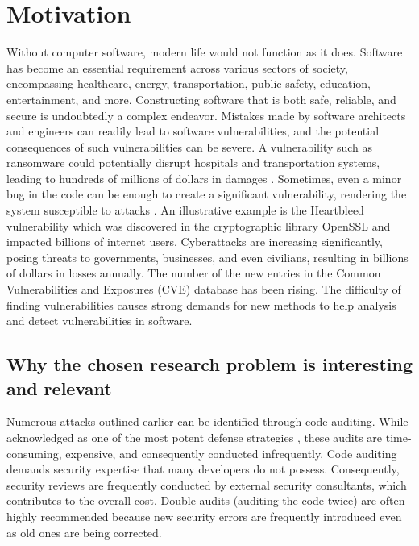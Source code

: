 \section{Motivation} %
\label{sec:motivation_chapter}
Without computer software, modern life would not function as it does. Software has become an essential requirement across various sectors of society, encompassing healthcare, energy, transportation, public safety, education, entertainment, and more. Constructing software that is both safe, reliable, and secure is undoubtedly a complex endeavor. Mistakes made by software architects and engineers can readily lead to software vulnerabilities, and the potential consequences of such vulnerabilities can be severe. A vulnerability such as ransomware could potentially disrupt hospitals and transportation systems, leading to hundreds of millions of dollars in damages \cite{Nadeem_Mohammed2023}. Sometimes, even a minor bug in the code can be enough to create a significant vulnerability, rendering the system susceptible to attacks \cite{Fabian_Markus_Konrad2023}. An illustrative example is the Heartbleed vulnerability \cite{Zakir_Durumeric2023} which was discovered in the cryptographic library OpenSSL and impacted billions of internet users. Cyberattacks are increasing significantly, posing threats to governments, businesses, and even civilians, resulting in billions of dollars in losses annually. The number of the new entries in the Common Vulnerabilities and Exposures (CVE) database has been rising. The difficulty of finding vulnerabilities causes strong demands for new methods to help analysis and detect vulnerabilities in software.

\subsection{ Why the chosen research problem is interesting and relevant} %
\label{sub:Research_relevance}

Numerous attacks outlined earlier can be identified through code auditing. While acknowledged as one of the most potent defense strategies \cite{Michael_Howard_2Editio}, these audits are time-consuming, expensive, and consequently conducted infrequently. Code auditing demands security expertise that many developers do not possess. Consequently, security reviews are frequently conducted by external security consultants, which contributes to the overall cost. Double-audits (auditing the code twice) are often highly recommended because new security errors are frequently introduced even as old ones are being corrected.


